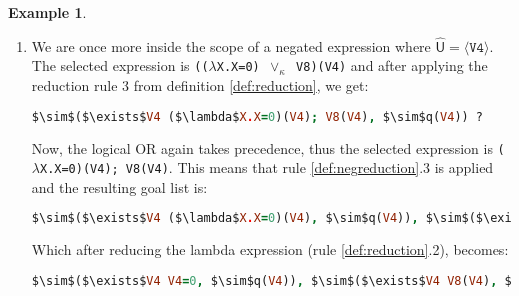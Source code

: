\documentclass[inscr,ack,preface]{dithesis}
\theoremstyle{definition}
\newtheorem{example}{Example}[chapter]
\newcommand{\msf}[1]{$\mathsf{#1}$}
\begin{document}
\begin{example}
\begin{enumerate}
The logical OR takes precedence and creates two possible paths. Initially, the first one is followed:
\begin{lstlisting}[language=Prolog,%
  frame=single,breaklines=false,mathescape=true]
  V5=0, $\sim$($\exists$V4 (($\lambda$X.X=V5) $\vee_{\kappa}$ V8)(V4), $\sim$q(V4)) ?
\end{lstlisting}

The selected expression is \texttt{V5=0}, which is a simple unification. Rule \ref{def:singlestepderivation}.5 is applied, which gives:
\begin{lstlisting}[language=Prolog,%
  frame=single,breaklines=false,mathescape=true]
  $\sim$($\exists$V4 (($\lambda$X.X=0) $\vee_{\kappa}$ V8)(V4), $\sim$q(V4)) ?
\end{lstlisting}

Here the situation becomes interesting, because we are now ready to compute the \msf{\ldots \land B} part of the constructive negation rule (definition \ref{def:negreduction}.7 (b)).

\item We are once more inside the scope of a negated expression where \msf{\widehat{U} = \langle \texttt{V4} \rangle}. The selected expression is \texttt{(($\lambda$X.X=0) $\vee_{\kappa}$ V8)(V4)} and after applying the reduction rule 3 from definition \ref{def:reduction}, we get:
\begin{lstlisting}[language=Prolog,%
  frame=single,breaklines=false,mathescape=true]
  $\sim$($\exists$V4 ($\lambda$X.X=0)(V4); V8(V4), $\sim$q(V4)) ?
\end{lstlisting}

Now, the logical OR again takes precedence, thus the selected expression is \texttt{($\lambda$X.X=0)(V4); V8(V4)}. This means that rule \ref{def:negreduction}.3 is applied and the resulting goal list is:
\begin{lstlisting}[language=Prolog,%
  frame=single,breaklines=false,mathescape=true]
  $\sim$($\exists$V4 ($\lambda$X.X=0)(V4), $\sim$q(V4)), $\sim$($\exists$V4 V8(V4), $\sim$q(V4)) ?
\end{lstlisting}

Which after reducing the lambda expression (rule \ref{def:reduction}.2), becomes:
\begin{lstlisting}[language=Prolog,%
  frame=single,breaklines=false,mathescape=true]
  $\sim$($\exists$V4 V4=0, $\sim$q(V4)), $\sim$($\exists$V4 V8(V4), $\sim$q(V4)) ?
\end{lstlisting}


\end{enumerate}
\end{example}
\end{document}
